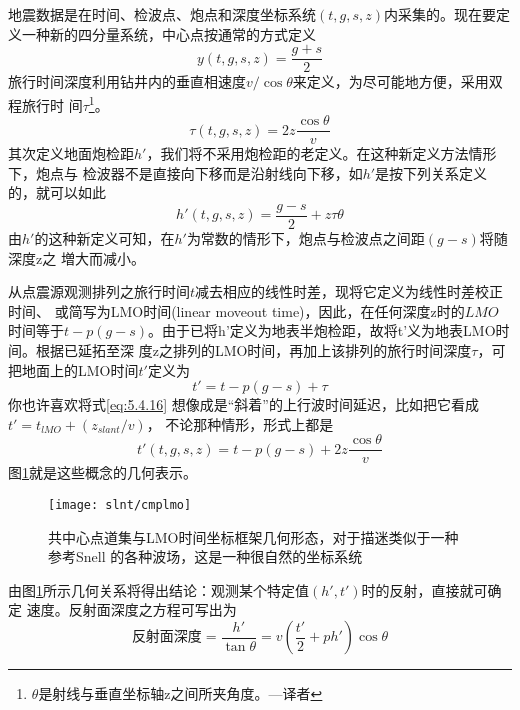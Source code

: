 地震数据是在时间、检波点、炮点和深度坐标系统$(t,g,s,z)$内采集的。现在要定
义一种新的四分量系统，中心点按通常的方式定义
\begin{equation}
y(t,g,s,z)=\frac{g+s}{2}
\label{eq:5.4.13}
\end{equation}
旅行时间深度利用钻井内的垂直相速度$v/\cos\theta$来定义，为尽可能地方便，采用双程旅行时
间$\tau$\footnote{
$\theta$是射线与垂直坐标轴z之间所夹角度。---译者
}。
\begin{equation}
\tau(t,g,s,z)=2z\frac{\cos\theta}{v}
\label{eq:5.4.14}
\end{equation} 
其次定义地面炮检距$h'$，我们将不采用炮检距的老定义。在这种新定义方法情形下，炮点与
检波器不是直接向下移而是沿射线向下移，如$h'$是按下列关系定义的，就可以如此
\begin{equation}
h'(t,g,s,z)=\frac{g-s}{2}+z\tau\theta
\label{eq:ex5.4.15}
\end{equation}
由$h'$的这种新定义可知，在$h'$为常数的情形下，炮点与检波点之间距$(g-s)$将随深度z之
増大而减小。

从点震源观测排列之旅行时间$t$减去相应的线性时差，现将它定义为线性时差校正时间、
或简写为LMO时间(linear moveout
time)，因此，在任何深度z时的$LMO$时间等于$t-p
(g-s)$。由于已将h'定义为地表半炮检距，故将t'义为地表LMO时间。根据已延拓至深
度z之排列的LMO时间，再加上该排列的旅行时间深度$\tau$，可把地面上的LMO时间$t'$定义为
\begin{equation}
t'=t-p(g-s)+\tau
\label{eq:5.4.16}
\end{equation}
你也许喜欢将式\ref{eq:5.4.16}
想像成是“斜着”的上行波时间延迟，比如把它看成$t'=t_{lMO}+(z_{slant}/v)$，
不论那种情形，形式上都是
\begin{equation}
t'(t,g,s,z)=t-p(g-s)+2z\frac{\cos\theta}{v}
\label{eq:5.4.17}
\end{equation}
图\ref{fig:slnt/cmplmo}就是这些概念的几何表示。

\begin{figure}[H]
\centering
\texttt{[image: slnt/cmplmo]}
\caption[cmplmo]{共中心点道集与LMO时间坐标框架几何形态，对于描迷类似于一种参考Snell
的各种波场，这是一种很自然的坐标系统
}
\label{fig:slnt/cmplmo}
\end{figure}

由图\ref{fig:slnt/cmplmo}所示几何关系将得出结论：观测某个特定值$(h',t')$时的反射，直接就可确定
速度。反射面深度之方程可写出为
\begin{equation}
\text{反射面深度}=\frac{h'}{\tan\theta}=v(\frac{t'}{2}+ph')\cos\theta
\label{eq:ex5.4.18}
\end{equation}

